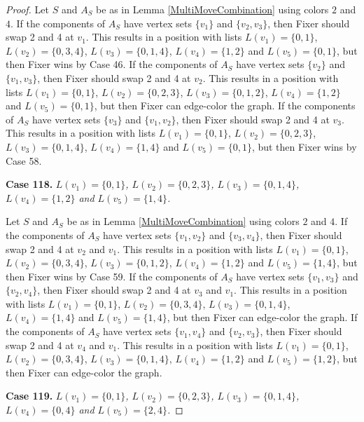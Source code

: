 \documentclass[12pt]{amsart}
\theoremstyle{plain}
\theoremstyle{definition}
\theoremstyle{remark}
\begin{document}
\begin{proof}
Let $S$ and $A_S$ be as in Lemma \ref{MultiMoveCombination} using colors $2$ and $4$. If the components of $A_S$ have vertex sets $\{v_1\}$ and $\{v_2, v_3\}$, then Fixer should swap 2 and 4 at $v_1$. This results in a position with lists $L(v_1) = \{0, 1\}$, $L(v_2) = \{0, 3, 4\}$, $L(v_3) = \{0, 1, 4\}$, $L(v_4) = \{1, 2\}$ and $L(v_5) = \{0, 1\}$, but then Fixer wins by Case 46.
If the components of $A_S$ have vertex sets $\{v_2\}$ and $\{v_1, v_3\}$, then Fixer should swap 2 and 4 at $v_2$. This results in a position with lists $L(v_1) = \{0, 1\}$, $L(v_2) = \{0, 2, 3\}$, $L(v_3) = \{0, 1, 2\}$, $L(v_4) = \{1, 2\}$ and $L(v_5) = \{0, 1\}$, but then Fixer can edge-color the graph.
If the components of $A_S$ have vertex sets $\{v_3\}$ and $\{v_1, v_2\}$, then Fixer should swap 2 and 4 at $v_3$. This results in a position with lists $L(v_1) = \{0, 1\}$, $L(v_2) = \{0, 2, 3\}$, $L(v_3) = \{0, 1, 4\}$, $L(v_4) = \{1, 4\}$ and $L(v_5) = \{0, 1\}$, but then Fixer wins by Case 58.

\noindent\textbf{Case 118.  }\textit{$L(v_1) = \{0, 1\}$, $L(v_2) = \{0, 2, 3\}$, $L(v_3) = \{0, 1, 4\}$, $L(v_4) = \{1, 2\}$ and $L(v_5) = \{1, 4\}$.}

Let $S$ and $A_S$ be as in Lemma \ref{MultiMoveCombination} using colors $2$ and $4$. If the components of $A_S$ have vertex sets $\{v_1, v_2\}$ and $\{v_3, v_4\}$, then Fixer should swap 2 and 4 at $v_2$ and $v_1$. This results in a position with lists $L(v_1) = \{0, 1\}$, $L(v_2) = \{0, 3, 4\}$, $L(v_3) = \{0, 1, 2\}$, $L(v_4) = \{1, 2\}$ and $L(v_5) = \{1, 4\}$, but then Fixer wins by Case 59.
If the components of $A_S$ have vertex sets $\{v_1, v_3\}$ and $\{v_2, v_4\}$, then Fixer should swap 2 and 4 at $v_3$ and $v_1$. This results in a position with lists $L(v_1) = \{0, 1\}$, $L(v_2) = \{0, 3, 4\}$, $L(v_3) = \{0, 1, 4\}$, $L(v_4) = \{1, 4\}$ and $L(v_5) = \{1, 4\}$, but then Fixer can edge-color the graph.
If the components of $A_S$ have vertex sets $\{v_1, v_4\}$ and $\{v_2, v_3\}$, then Fixer should swap 2 and 4 at $v_4$ and $v_1$. This results in a position with lists $L(v_1) = \{0, 1\}$, $L(v_2) = \{0, 3, 4\}$, $L(v_3) = \{0, 1, 4\}$, $L(v_4) = \{1, 2\}$ and $L(v_5) = \{1, 2\}$, but then Fixer can edge-color the graph.

\noindent\textbf{Case 119.  }\textit{$L(v_1) = \{0, 1\}$, $L(v_2) = \{0, 2, 3\}$, $L(v_3) = \{0, 1, 4\}$, $L(v_4) = \{0, 4\}$ and $L(v_5) = \{2, 4\}$.}


\end{proof}
\end{document}
